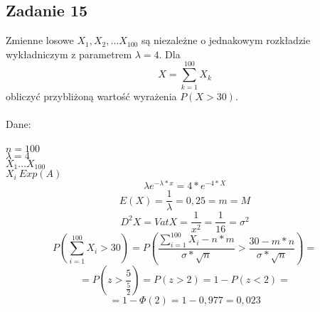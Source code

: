 \subsection{Zadanie 15}
	
Zmienne losowe $X_1, X_2 , \ldots X_{100}$ są niezależne o jednakowym rozkładzie wykładniczym z parametrem $\lambda = 4$. Dla
$$
X = \sum_{k=1}^{100} X_{k}
$$ 
obliczyć przybliżoną wartość wyrażenia $P(X>30)$.  \\ \\
Dane:\\\\
$  n = 100  $ \\
$ \lambda = 4 $ \\
$ X_1 \ldots X_{100} $ \\
$ X_i ~ Exp(A) $ \\
$$ \lambda e^{-\lambda*x} = 4*e^{-4*X} $$
$$ E(X) = \frac{1}{\lambda} = 0,25 = m = M $$
$$ D^{2}X = VatX = \frac{1}{x^{2}} = \frac{1}{16} = \sigma^{2} $$
$$ P(\sum_{i=1}^{100} X_{i} > 30) = P(\frac{\sum_{i=1}^{100} X_{i} - n*m}{\sigma * \sqrt{n}} > \frac{30 - m*n}{\sigma * \sqrt{n}}) = $$
$$ = P(z > \frac{5}{\frac{5}{2}}) = P( z > 2) = 1 -  P(z < 2) = $$
$$ = 1 - \Phi(2) = 1 - 0,977 = 0,023 $$
